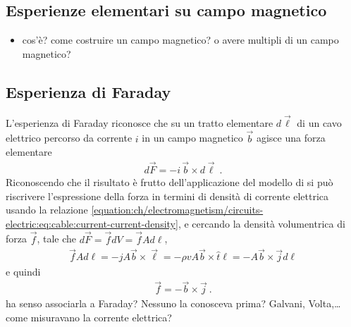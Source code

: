 \documentclass[letterpaper,10pt,italian]{jupyterBook}
\begin{document}
\subsection{Esperienze elementari su campo magnetico}
\label{\detokenize{ch/electromagnetism/electromagnetism-steady:esperienze-elementari-su-campo-magnetico}}\label{\detokenize{ch/electromagnetism/electromagnetism-steady:physics-hs-electromagnetism-electromagnetism-steady-experience}}\begin{itemize}
\item {} 
\sphinxAtStartPar
cos’è? come costruire un campo magnetico? o avere multipli di un campo magnetico?

\end{itemize}


\subsection{Esperienza di Faraday}
\label{\detokenize{ch/electromagnetism/electromagnetism-steady:esperienza-di-faraday}}\label{\detokenize{ch/electromagnetism/electromagnetism-steady:physics-hs-electromagnetism-electromagnetism-steady-experience-faraday}}
\sphinxAtStartPar
L’esperienza di Faraday riconosce che su un tratto elementare \(d \vec{\ell}\) di un cavo elettrico percorso da corrente \(i\) in un campo magnetico \(\vec{b}\) agisce una forza elementare
\begin{equation}\label{equation:ch/electromagnetism/electromagnetism-steady:eq:faraday:force}
\begin{split}d \vec{F} = - i \, \vec{b} \times d \vec{\ell} \ .\end{split}
\end{equation}
\sphinxAtStartPar
Riconoscendo che il risultato è frutto dell’applicazione del modello di {\hyperref[\detokenize{ch/electromagnetism/circuits-electric:physics-hs-electromagnetism-circuits-electric-electric-cable}]{}} si può riscrivere l’espressione della forza in termini di densità di corrente elettrica usando la relazione \eqref{equation:ch/electromagnetism/circuits-electric:eq:cable:current-current-density}, e cercando la densità volumentrica di forza \(\vec{f}\), tale che \(d \vec{F} = \vec{f} dV = \vec{f} A d \ell\),
\begin{equation*}
\begin{split}\vec{f} A d \ell = - j A \vec{b} \times \vec{\ell} = - \rho v A \vec{b} \times \hat{t} \ell = - A \vec{b} \times \vec{j} d \ell\end{split}
\end{equation*}
\sphinxAtStartPar
e quindi
\begin{equation*}
\begin{split}\vec{f} = - \vec{b} \times \vec{j} \ .\end{split}
\end{equation*}
\sphinxAtStartPar
{} ha senso associarla a Faraday? Nessuno la conosceva prima? Galvani, Volta,… come misuravano la corrente elettrica?
\end{document}
